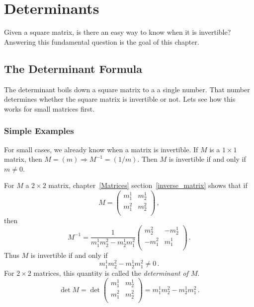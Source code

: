 \chapter{Determinants}\label{elementarydeterminants}

Given a square matrix, is there an easy way to know when it is invertible?  Answering this fundamental question is 
the goal of this chapter.

\section{The Determinant Formula}

The determinant boils down a square matrix to a a single number. That number determines whether the square matrix is invertible or not.  
Lets see how this works for small matrices first.

\subsection{Simple Examples}

For small cases, we already know when a matrix is invertible.  If $M$ is a $1\times 1$ matrix, then $M=(m) \Rightarrow M^{-1}=(1/m)$.  Then $M$ is invertible if and only if $m\neq 0$.

\vspace{.3cm}

For $M$ a $2\times 2$ matrix, chapter~\ref{Matrices} section~\ref{inverse_matrix} shows that if \[M=\begin{pmatrix}
m^1_1 & m^1_2 \\[1mm]
m^2_1 & m^2_2 \\
\end{pmatrix}\, ,\] then \[M^{-1}=\frac{1}{m^1_1m^2_2-m^1_2m^2_1}\begin{pmatrix}
m^2_2 & -m^1_2 \\[1mm]
-m^2_1 & m^1_1 \\
\end{pmatrix}\, .\] Thus $M$ is invertible if and only if 
\[m^1_1m^2_2-m^1_2m^2_1\neq 0\, .\]  For $2\times 2$ matrices, this quantity is called the \emph{determinant of $M$}.
\[
\det M = \det \begin{pmatrix}
m^1_1 & m^1_2 \\[1mm]
m^2_1 & m^2_2 \\
\end{pmatrix} = m^1_1m^2_2-m^1_2m^2_1\, .
\]

